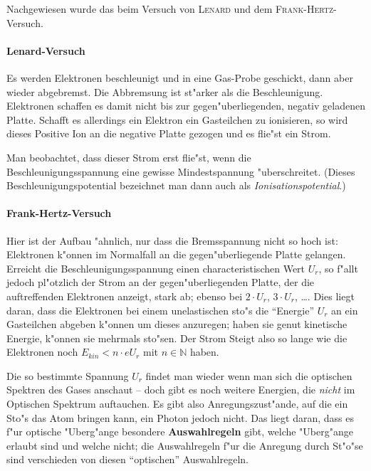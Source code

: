 \documentclass[a4paper,draft]{article}
\begin{document}
Nachgewiesen wurde das beim Versuch von \textsc{Lenard} und dem
\textsc{Frank-Hertz}-Versuch. 

\paragraph{Lenard-Versuch}
\label{sec:lenard_versuch}

Es werden Elektronen beschleunigt und in eine Gas-Probe geschickt,
dann aber wieder abgebremst. Die Abbremsung ist st"arker als
die Beschleunigung. Elektronen schaffen es damit nicht bis zur
gegen"uberliegenden, negativ geladenen Platte. Schafft es allerdings
ein Elektron ein Gasteilchen zu ionisieren, so wird dieses Positive
Ion an die negative Platte gezogen und es flie"st ein Strom.

Man beobachtet, dass dieser Strom erst flie"st, wenn die
Beschleunigungsspannung eine gewisse Mindestspannung
"uberschreitet. (Dieses Beschleunigungspotential bezeichnet man dann
auch als \emph{Ionisationspotential}.)

\paragraph{Frank-Hertz-Versuch}
\label{sec:lenard_versuch-1}

Hier ist der Aufbau "ahnlich, nur dass die Bremsspannung nicht so hoch
ist: Elektronen k"onnen im Normalfall an die gegen"uberliegende Platte
gelangen. Erreicht die Beschleunigungsspannung einen
characteristischen Wert $U_r$, so f"allt jedoch pl"otzlich der Strom
an der gegen"uberliegenden Platte, der die auftreffenden Elektronen
anzeigt, stark ab; ebenso bei $2 \cdot U_r$, $3 \cdot U_r$,
\dots. Dies liegt daran, dass die Elektronen bei einem unelastischen
sto"s die "`Energie"' $U_r$ an ein Gasteilchen abgeben k"onnen um
dieses anzuregen; haben sie genut kinetische Energie, k"onnen sie
mehrmals sto"sen. Der Strom Steigt also so lange wie die Elektronen
noch $E_{kin} < n \cdot eU_r$ mit $n \in \mathbb N$ haben.

\abs
Die so bestimmte Spannung $U_r$ findet man wieder wenn man sich die
optischen Spektren des Gases anschaut -- doch gibt es noch weitere
Energien, die \emph{nicht} im Optischen Spektrum auftauchen. Es gibt
also Anregungszust"ande, auf die ein Sto"s das Atom bringen kann, ein
Photon jedoch nicht. Das liegt daran, dass es f"ur optische
"Uberg"ange besondere \textbf{Auswahlregeln} gibt, welche "Uberg"ange
erlaubt sind und welche nicht; die Auswahlregeln f"ur die Anregung
durch St"o"se sind verschieden von diesen "`optischen"' Auswahlregeln.
\end{document}
